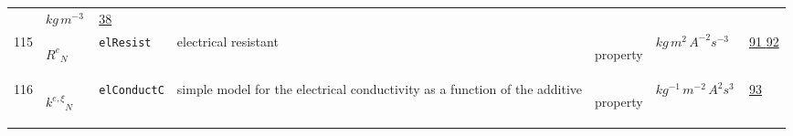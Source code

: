 \begin{longtable}{|p{1cm}|p{2.5cm}|p{4.5cm}|p{8cm}|p{3.0cm}|p{3cm}|p{1cm}|}
             & $ kg \,m^{-3} \, $
             & \hyperlink{"e:38"}{ 38 }
                 \\
    115
             & \hypertarget{"v:115"}{ $ {{R^e}}{_{N}} $}
             & \verb|elResist|
             & electrical resistant
             & \begin{lay}property \end{lay}
             & $ kg \,m^{2} \,A^{-2} s^{-3} \, $
             & \hyperlink{"e:91"}{ 91 }
                 \hyperlink{"e:92"}{ 92 }
                 \\
    116
             & \hypertarget{"v:116"}{ $ {{k^{e,\xi}}}{_{N}} $}
             & \verb|elConductC|
             & simple model for the electrical conductivity as a function of the additive
             & \begin{lay}property \end{lay}
             & $ kg^{-1} \,m^{-2} \,A^{2} s^{3} \, $
             & \hyperlink{"e:93"}{ 93 }
                 \\
    \end{longtable}
